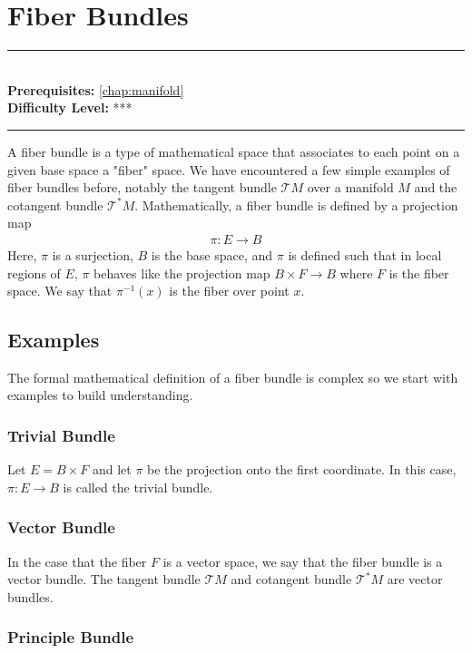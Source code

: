 \documentclass[book.tex]{subfiles}
\begin{document}
\chapter{Fiber Bundles}
\label{chap:fiber_bundles}
\noindent\rule{11cm}{0.4pt} \\
\textbf{Prerequisites:} \autoref{chap:manifold} \\
\textbf{Difficulty Level:} *** \\
\noindent\rule{11cm}{0.4pt}
\vspace{5mm}

A fiber bundle is a type of mathematical space that associates to each point on a given base space a "fiber" space. We have encountered a few simple examples of fiber bundles before, notably the tangent bundle $\mathcal{T}M$ over a manifold $M$ and the cotangent bundle $\mathcal{T}^*M$. Mathematically, a fiber bundle is defined by a projection map
\begin{align}
    \pi: E \to B
\end{align}
Here, $\pi$ is a surjection, $B$ is the base space, and $\pi$ is defined such that in local regions of $E$, $\pi$ behaves like the projection map $B \times F \to B$ where $F$ is the fiber space. We say that $\pi^{-1}(x)$ is the fiber over point $x$.

\section{Examples}

The formal mathematical definition of a fiber bundle is complex so we start with examples to build understanding.

\subsection{Trivial Bundle}

Let $E = B \times F$ and let $\pi$ be the projection onto the first coordinate. In this case, $\pi: E \to B$ is called the trivial bundle.

\subsection{Vector Bundle}

In the case that the fiber $F$ is a vector space, we say that the fiber bundle is a vector bundle. The tangent bundle $\mathcal{T}M$ and cotangent bundle $\mathcal{T}^*M$ are vector bundles.

\subsection{Principle Bundle}
\end{document}
